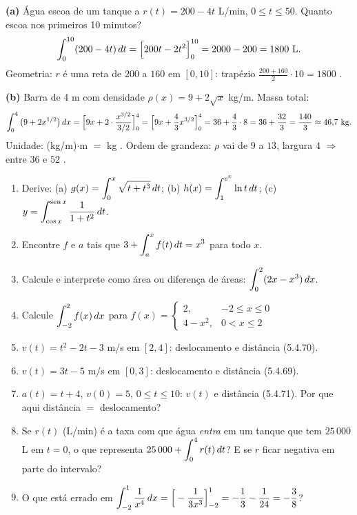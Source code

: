 \begin{exemplo}
\textbf{(a)} Água escoa de um tanque a $r(t)=200-4t$ L/min, $0\le t\le50$. Quanto escoa nos primeiros 10 minutos?
\[
\int_0^{10}(200-4t)\dt=\Big[200t-2t^2\Big]_0^{10}=2000-200=1800\ \text{L}.
\]
Geometria: $r$ é uma reta de $200$ a $160$ em $[0,10]$: trapézio $\frac{200+160}{2}\cdot10=1800$ \ok.

\textbf{(b)} Barra de 4 m com densidade $\rho(x)=9+2\sqrt x$ kg/m. Massa total:
\[
\int_0^4\big(9+2x^{1/2}\big)\dx=\Big[9x+2\cdot\frac{x^{3/2}}{3/2}\Big]_0^4=\Big[9x+\frac43x^{3/2}\Big]_0^4=36+\frac43\cdot8=36+\frac{32}{3}=\frac{140}{3}\approx46{,}7\ \text{kg}.
\]
Unidade: (kg/m)$\cdot$m $=$ kg \ok. Ordem de grandeza: $\rho$ vai de $9$ a $13$, largura $4$ $\Rightarrow$ entre $36$ e $52$ \ok.
\end{exemplo}

\begin{exercicios}
\begin{enumerate}[leftmargin=1.6em, itemsep=2pt, label=\textbf{4.\arabic*}]
\item Derive: (a) $g(x)=\displaystyle\int_0^x\sqrt{t+t^3}\,dt$; \;(b) $h(x)=\displaystyle\int_1^{e^x}\ln t\,dt$; \;(c) $y=\displaystyle\int_{\cos x}^{\operatorname{sen} x}\frac{1}{1+t^2}\,dt$.
\item Encontre $f$ e $a$ tais que $\displaystyle 3+\int_a^x f(t)\,dt=x^3$ para todo $x$.
\item Calcule e interprete como área ou diferença de áreas: $\displaystyle\int_0^2(2x-x^3)\,dx$.
\item Calcule $\displaystyle\int_{-2}^{2}f(x)\,dx$ para $f(x)=\begin{cases}2,&-2\le x\le0\\4-x^2,&0<x\le2\end{cases}$
\item $v(t)=t^2-2t-3$ m/s em $[2,4]$: deslocamento e distância (5.4.70).
\item $v(t)=3t-5$ m/s em $[0,3]$: deslocamento e distância (5.4.69).
\item $a(t)=t+4$, $v(0)=5$, $0\le t\le10$: $v(t)$ e distância (5.4.71). Por que aqui distância $=$ deslocamento?
\item Se $r(t)$ (L/min) é a taxa com que água \emph{entra} em um tanque que tem $25\,000$ L em $t=0$, o que representa $25\,000+\displaystyle\int_0^{4}r(t)\,dt$? E se $r$ ficar negativa em parte do intervalo?
\item O que está errado em $\displaystyle\int_{-2}^{1}\frac{1}{x^4}\,dx=\Big[-\frac{1}{3x^3}\Big]_{-2}^{1}=-\frac13-\frac{1}{24}=-\frac{3}{8}$?
\end{enumerate}
\end{exercicios}
